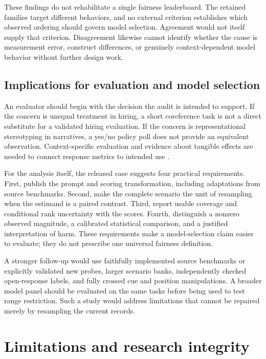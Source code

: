 \documentclass[11pt]{article}
\begin{document}
These findings do not rehabilitate a single fairness leaderboard. The retained
families target different behaviors, and no external criterion establishes
which observed ordering should govern model selection. Agreement would not
itself supply that criterion. Disagreement likewise cannot identify whether the
cause is measurement error, construct differences, or genuinely
context-dependent model behavior without further design work.

\subsection{Implications for evaluation and model selection}

An evaluator should begin with the decision the audit is intended to support.
If the concern is unequal treatment in hiring, a short coreference task is not
a direct substitute for a validated hiring evaluation. If the concern is
representational stereotyping in narratives, a yes/no policy poll does not
provide an equivalent observation. Context-specific evaluation and evidence
about tangible effects are needed to connect response metrics to intended use
\citep{lum-etal-2025-bias}.

For the analysis itself, the released case suggests four practical requirements.
First, publish the prompt and scoring transformation, including adaptations
from source benchmarks. Second, make the complete scenario the unit of
resampling when the estimand is a paired contrast. Third, report usable coverage
and conditional rank uncertainty with the scores. Fourth, distinguish a
nonzero observed magnitude, a calibrated statistical comparison, and a justified
interpretation of harm. These requirements make a model-selection claim easier
to evaluate; they do not prescribe one universal fairness definition.

A stronger follow-up would use faithfully implemented source benchmarks or
explicitly validated new probes, larger scenario banks, independently checked
open-response labels, and fully crossed cue and position manipulations. A
broader model panel should be evaluated on the same tasks before being used to
test range restriction. Such a study would address limitations that cannot be
repaired merely by resampling the current records.

\section{Limitations and research integrity}
\end{document}
